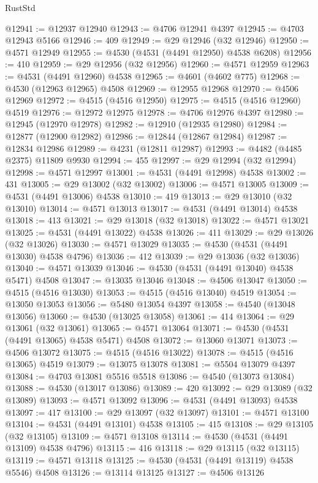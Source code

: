 \begin{lexlean}{RustStd}
\begin{coremodule}
{\begin{coremodule}
{{{{{{{{{{{{{{{{{{{{{{{{{{{{{{{{{{{{{{{{{{{{{{{{{{{{{{{@12941 := @12937 @12940
@12943 := @4706 @12941 @4397
@12945 := @4703 @12943 @5166
@12946 := 409
@12949 := @29 @12946 (@32 @12946)
@12950 := @4571 @12949
@12955 := @4530 (@4531 (@4491 @12950) @4538 @6208)
@12956 := 410
@12959 := @29 @12956 (@32 @12956)
@12960 := @4571 @12959
@12963 := @4531 (@4491 @12960) @4538
@12965 := @4601 (@4602 @775)
@12968 := @4530 (@12963 @12965) @4508
@12969 := @12955 @12968
@12970 := @4506 @12969
@12972 := @4515 (@4516 @12950)
@12975 := @4515 (@4516 @12960) @4519
@12976 := @12972 @12975
@12978 := @4706 @12976 @4397
@12980 := @12945 (@12970 @12978)
@12982 := @12910 (@12935 @12980)
@12984 := @12877 (@12900 @12982)
@12986 := @12844 (@12867 @12984)
@12987 := @12834 @12986
@12989 := @4231 (@12811 @12987)
@12993 := @4482 (@4485 @2375) @11809 @9930
@12994 := 455
@12997 := @29 @12994 (@32 @12994)
@12998 := @4571 @12997
@13001 := @4531 (@4491 @12998) @4538
@13002 := 431
@13005 := @29 @13002 (@32 @13002)
@13006 := @4571 @13005
@13009 := @4531 (@4491 @13006) @4538
@13010 := 419
@13013 := @29 @13010 (@32 @13010)
@13014 := @4571 @13013
@13017 := @4531 (@4491 @13014) @4538
@13018 := 413
@13021 := @29 @13018 (@32 @13018)
@13022 := @4571 @13021
@13025 := @4531 (@4491 @13022) @4538
@13026 := 411
@13029 := @29 @13026 (@32 @13026)
@13030 := @4571 @13029
@13035 := @4530 (@4531 (@4491 @13030) @4538 @4796)
@13036 := 412
@13039 := @29 @13036 (@32 @13036)
@13040 := @4571 @13039
@13046 := @4530 (@4531 (@4491 @13040) @4538 @5471) @4508
@13047 := @13035 @13046
@13048 := @4506 @13047
@13050 := @4515 (@4516 @13030)
@13053 := @4515 (@4516 @13040) @4519
@13054 := @13050 @13053
@13056 := @5480 @13054 @4397
@13058 := @4540 (@13048 @13056)
@13060 := @4530 (@13025 @13058)
@13061 := 414
@13064 := @29 @13061 (@32 @13061)
@13065 := @4571 @13064
@13071 := @4530 (@4531 (@4491 @13065) @4538 @5471) @4508
@13072 := @13060 @13071
@13073 := @4506 @13072
@13075 := @4515 (@4516 @13022)
@13078 := @4515 (@4516 @13065) @4519
@13079 := @13075 @13078
@13081 := @5504 @13079 @4397
@13084 := @4703 @13081 @5516 @5518
@13086 := @4540 (@13073 @13084)
@13088 := @4530 (@13017 @13086)
@13089 := 420
@13092 := @29 @13089 (@32 @13089)
@13093 := @4571 @13092
@13096 := @4531 (@4491 @13093) @4538
@13097 := 417
@13100 := @29 @13097 (@32 @13097)
@13101 := @4571 @13100
@13104 := @4531 (@4491 @13101) @4538
@13105 := 415
@13108 := @29 @13105 (@32 @13105)
@13109 := @4571 @13108
@13114 := @4530 (@4531 (@4491 @13109) @4538 @4796)
@13115 := 416
@13118 := @29 @13115 (@32 @13115)
@13119 := @4571 @13118
@13125 := @4530 (@4531 (@4491 @13119) @4538 @5546) @4508
@13126 := @13114 @13125
@13127 := @4506 @13126
}}}}}}}}}}}}}}}}}}}}}}}}}}}}}}}}}}}}}}}}}}}}}}}}}}}}}}}
\end{coremodule}}
\end{coremodule}
\end{lexlean}
